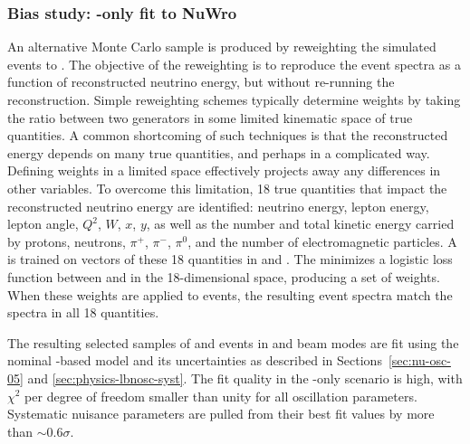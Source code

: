 \subsubsection{Bias study: -only fit to NuWro}
\label{sec:FDonlyNuWro}


An alternative Monte Carlo sample is produced by reweighting the  simulated events to . The objective of the reweighting is to reproduce the  event spectra as a function of reconstructed neutrino energy, but without re-running the reconstruction. Simple reweighting schemes typically determine weights by taking the ratio between two generators in some limited kinematic space of true quantities. A common shortcoming of such techniques is that the reconstructed energy depends on many true quantities, and perhaps in a complicated way. Defining weights in a limited space effectively projects away any differences in other variables. To overcome this limitation, 18 true quantities that impact the reconstructed neutrino energy are identified: neutrino energy, lepton energy, lepton angle, $Q^{2}$, $W$, $x$, $y$, as well as the number and total kinetic energy carried by protons, neutrons, $\pi^{+}$, $\pi^{-}$, $\pi^{0}$, and the number of electromagnetic particles. A  is trained on vectors of these 18 quantities in  and . The  minimizes a logistic loss function between  and  in the 18-dimensional space, producing a set of weights. When these weights are applied to  events, the resulting event spectra match the  spectra in all 18 quantities.

The resulting selected samples of  \numu and \nue {} events in  and  beam modes are fit using the nominal -based model and its uncertainties as described in Sections~\ref{sec:nu-osc-05} and \ref{sec:physics-lbnosc-syst}. The fit quality in the -only scenario is high, with $\chi^{2}$ per degree of freedom smaller than unity for all oscillation parameters. Systematic nuisance parameters are pulled from their best fit values by more than $\sim$0.6$\sigma$. 

